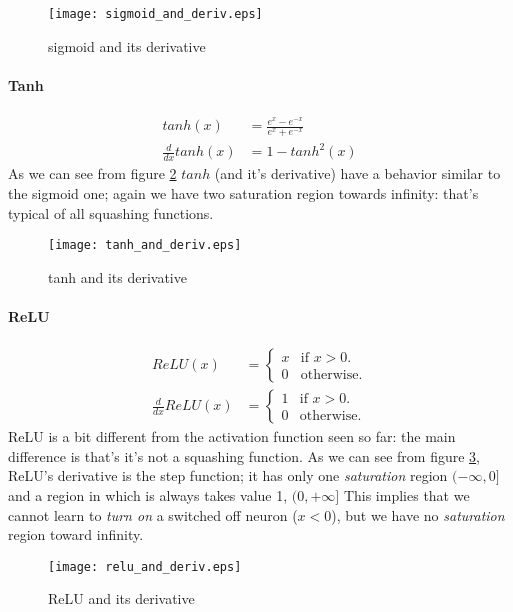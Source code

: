 \begin{figure}[ht]
  \centering
    \texttt{[image: sigmoid\_and\_deriv.eps]}
  \caption{sigmoid and its derivative}
\label{sigmoid_plot}
\end{figure}

\paragraph{Tanh}
\begin{align}
 tanh(x)&=\frac{e^x-e^{-x}}{e^x+e^{-x}} \\
 \frac{d}{dx}tanh(x)&= 1 - tanh^2(x)  
\end{align}
As we can see from figure \ref{tanh_plot} $tanh$ (and it's derivative) have a behavior similar to the sigmoid one; again we have two saturation region towards
infinity: that's typical of all squashing functions.



\begin{figure}[ht]
  \centering
    \texttt{[image: tanh\_and\_deriv.eps]}
  \caption{tanh and its derivative}
\label{tanh_plot}
\end{figure}



\paragraph{ReLU}


\begin{align}
  ReLU(x)&=\begin{cases}
    x & \text{if $x>0$}.\\
    0 & \text{otherwise}.
  \end{cases} \\ 
   \frac{d}{dx}ReLU(x)&=\begin{cases}
    1 & \text{if $x>0$}.\\
    0 & \text{otherwise}.
  \end{cases}
\end{align}
ReLU is a bit different from the activation function seen so far: the main difference is that's it's not a squashing function.
As we can see from figure \ref{relu_plot}, ReLU's derivative is the step function; it has only one \textit{saturation} region $(-\infty, 0]$ and a region in which is always takes value 1, $(0,+\infty]$
This implies that we cannot learn to \textit{turn on} a switched off neuron ($x<0$), but we have no \textit{saturation} region toward infinity.

\begin{figure}[ht]
  \centering
    \texttt{[image: relu\_and\_deriv.eps]}
  \caption{ReLU and its derivative}
\label{relu_plot}
\end{figure}

